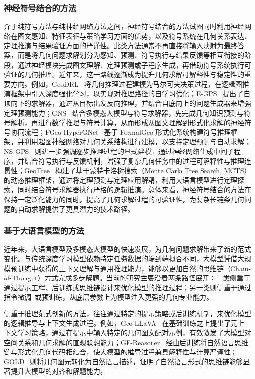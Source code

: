 \subsubsection{神经符号结合的方法}

介于纯符号方法与纯神经网络方法之间，神经符号结合的方法试图同时利用神经网络在图文感知、特征表征与策略学习方面的优势，以及符号系统在几何关系表达、定理推演与结果验证方面的严谨性。此类方法通常不再直接将输入映射为最终答案，而是将几何问题求解划分为感知、预测、符号执行与结果反馈等相互衔接的阶段，通过神经模块完成图文理解、定理预测或子程序生成，再借助符号系统执行可验证的几何推理。近年来，这一路线逐渐成为提升几何求解可解释性与稳定性的重要方向。例如，GeoDRL~\cite{peng2023geodrl} 将几何推理过程建模为马尔可夫决策过程，在逻辑图推演框架中引入深度强化学习，以实现对推理路径的自学习优化；E-GPS~\cite{wu2024egps} 提出了自顶向下的求解器，通过从目标出发反向推理，并结合自底向上的问题生成器来增强定理预测能力；GNS~\cite{ning2025gns} 结合多模态大模型与符号求解器，先完成几何知识预测与符号解析，再进行数学推理与符号计算，从而形成从图文理解到形式化求解的神经符号协同流程；FGeo-HyperGNet~\cite{zhang2024fgeo_hypergnet} 基于 FormalGeo 形式化系统构建符号推理框架，并利用超图神经网络对几何关系结构进行建模，以支持定理预测与自动求解；NS-GPS~\cite{wang2025reasoning} 则进一步强调逐步推理过程的显式建模，通过神经网络生成中间子程序，并结合符号执行与反馈机制，增强了复杂几何任务中的过程可解释性与推理连贯性；GeoTree~\cite{wang2026geotree} 构建了基于蒙特卡洛树搜索（Monte Carlo Tree Search, MCTS）的动态推理框架，通过将定理预测与定理应用解耦，利用大语言模型进行定理探索，同时结合符号求解器执行严格的逻辑推演。总体来看，神经符号结合的方法在保持一定泛化能力的同时，提高了几何求解过程的可验证性，为复杂长链条几何问题的自动求解提供了更具潜力的技术路径。

\subsubsection{基于大语言模型的方法}

近年来，大语言模型及多模态大模型的快速发展，为几何问题求解带来了新的范式变化。与传统深度学习模型依赖特定任务数据的端到端拟合不同，大模型凭借大规模预训练中获得的上下文理解与通用推理能力，能够以更加自然的思维链（Chain-of-Thought）方式完成多步解题。当前的研究主要沿着两条路径展开：一类侧重于通过提示工程、后训练或思维链设计来优化模型的推理过程；另一类则侧重于通过指令微调~\cite{tang2026finetunesurvey}或预训练，从底层参数上为模型注入更强的几何专业能力。

侧重于推理范式创新的方法，往往通过特定的提示策略或后训练机制，来优化模型的逻辑推导与上下文生成过程。例如，Geo-LLaVA~\cite{xu2024geollava} 在基础训练之上提出了元上下文学习策略，通过在提示中输入特定的几何图文配对示例，有效激发了大模型对空间关系和几何求解的直观联想能力；GF-Reasoner~\cite{yang2025GFReasoner} 经由后训练将自然语言思维链与形式化几何代码相结合，使大模型的推导过程兼具解释性与计算严谨性；GOLD~\cite{zhang2024gold} 则将几何图元转化为自然语言描述，证明了自然语言形式的思维链能够显著提升大模型的对齐和解题能力。

